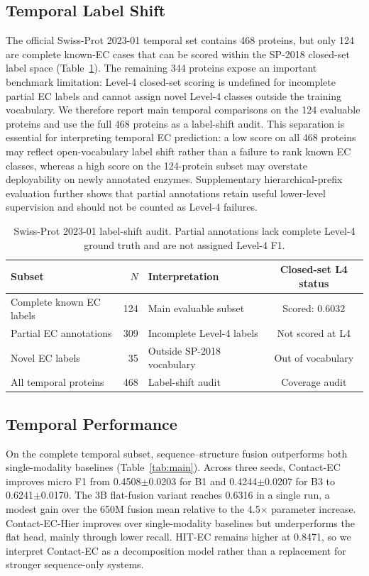 \documentclass[namedate,contemporary,mediumone]{oup-authoring-template}
\begin{document}
\subsection{Temporal Label Shift}

The official Swiss-Prot 2023-01 temporal set contains 468 proteins, but only 124
are complete known-EC cases that can be scored within the SP-2018 closed-set label
space (Table~\ref{tab:labelshift}). The remaining 344 proteins expose an important
benchmark limitation: Level-4 closed-set scoring is undefined for incomplete
partial EC labels and cannot assign novel Level-4 classes outside the training
vocabulary. We therefore report main temporal
comparisons on the 124 evaluable proteins and use the full 468 proteins as a
label-shift audit. This separation is essential for interpreting temporal EC
prediction: a low score on all 468 proteins may reflect open-vocabulary label
shift rather than a failure to rank known EC classes, whereas a high score on the
124-protein subset may overstate deployability on newly annotated enzymes.
Supplementary hierarchical-prefix evaluation further shows that partial
annotations retain useful lower-level supervision and should not be counted as
Level-4 failures.

\begin{table}[htbp]
\centering
\caption{Swiss-Prot 2023-01 label-shift audit. Partial annotations lack complete
Level-4 ground truth and are not assigned Level-4 F1.}
\label{tab:labelshift}
\setlength{\tabcolsep}{5pt}
\begin{tabular}{lrlc}
\toprule
Subset & $N$ & Interpretation & Closed-set L4 status \\
\midrule
Complete known EC labels & 124 & Main evaluable subset & Scored: 0.6032 \\
Partial EC annotations   & 309 & Incomplete Level-4 labels & Not scored at L4 \\
Novel EC labels          & 35  & Outside SP-2018 vocabulary & Out of vocabulary \\
All temporal proteins    & 468 & Label-shift audit & Coverage audit \\
\bottomrule
\end{tabular}
\end{table}

\subsection{Temporal Performance}

On the complete temporal subset, sequence--structure fusion outperforms both
single-modality baselines (Table~\ref{tab:main}). Across three seeds, Contact-EC
improves micro F1 from 0.4508$\pm$0.0203 for B1 and 0.4244$\pm$0.0207 for B3 to
0.6241$\pm$0.0170. The 3B flat-fusion variant reaches 0.6316 in a single run, a
modest gain over the 650M fusion mean relative to the 4.5$\times$ parameter
increase. Contact-EC-Hier improves over single-modality baselines but
underperforms the flat head, mainly through lower recall. HIT-EC remains higher
at 0.8471, so we interpret Contact-EC as a decomposition model rather than a
replacement for stronger sequence-only systems.
\end{document}
